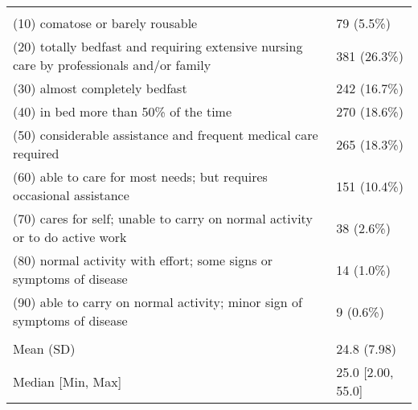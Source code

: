\begin{tabular}[t]{ll}
\addlinespace[0.3em]
\multicolumn{2}{l}{\textbf{AKPS}}\\
\hspace{1em}(10) comatose or barely rousable & 79 (5.5\%)\\
(20) totally bedfast and requiring extensive nursing care 
\hspace{1em}by professionals and/or family & 381 (26.3\%)\\
\hspace{1em}(30) almost completely bedfast & 242 (16.7\%)\\
\hspace{1em}(40) in bed more than 50\% of the time & 270 (18.6\%)\\
\hspace{1em}(50) considerable assistance and frequent medical care required & 265 (18.3\%)\\
\hspace{1em}(60) able to care for most needs; but requires occasional assistance & 151 (10.4\%)\\
(70) cares for self; unable to carry on normal activity or 
\hspace{1em}to do active work & 38 (2.6\%)\\
\hspace{1em}(80) normal activity with effort; some signs or symptoms of disease & 14 (1.0\%)\\
(90) able to carry on normal activity; minor sign of symptoms 
\hspace{1em}of disease & 9 (0.6\%)\\
\addlinespace[0.3em]
\multicolumn{2}{l}{\textbf{IPOS total score}}\\
\hspace{1em}Mean (SD) & 24.8 (7.98)\\
\hspace{1em}Median [Min, Max] & 25.0 [2.00, 55.0]\\
\bottomrule
\end{tabular}
